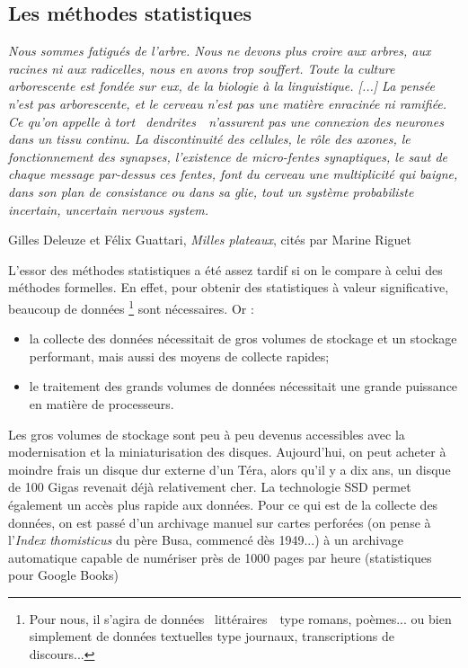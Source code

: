 \documentclass{article}
\newenvironment{citationbox}
{\begin{center}
		\begin{minipage}{.8\textwidth}
		}
		{
		\end{minipage}	
\end{center}
}
\begin{document}
			
		\subsection{Les méthodes statistiques}\label{methodes_stat}
			\begin{citationbox}
				\textit{Nous sommes fatigués de l'arbre. Nous ne devons plus croire aux arbres, aux racines ni aux radicelles, nous en avons trop souffert. Toute la culture arborescente est fondée sur eux, de la biologie à la linguistique. [...] La pensée n'est pas arborescente, et le cerveau n'est pas une matière enracinée ni ramifiée. Ce qu'on appelle à tort  \guillemotleft~dendrites~\guillemotright~n'assurent pas une connexion des neurones dans un tissu continu. La discontinuité des cellules, le rôle des axones, le fonctionnement des synapses, l'existence de micro-fentes synaptiques, le saut de chaque message par-dessus ces fentes, font du cerveau une multiplicité qui baigne, dans son plan de consistance ou dans sa glie, tout un système probabiliste incertain, uncertain nervous system.}
				\begin{flushright}
					Gilles Deleuze et Félix Guattari, \textit{Milles plateaux}, cités par Marine Riguet \autocite{riguet2017}
				\end{flushright}
			\end{citationbox}
			L'essor des méthodes statistiques a été assez tardif si on le compare à celui des méthodes formelles. En effet, pour obtenir des statistiques à valeur significative, beaucoup de données \footnote{Pour nous, il s'agira de données \guillemotleft~littéraires~\guillemotright~type romans, poèmes... ou bien simplement de données textuelles type journaux, transcriptions de discours...} sont nécessaires. Or :
			\vspace{2mm}
			\begin{itemize}
				\item la collecte des données nécessitait de gros volumes de stockage et un stockage performant, mais aussi des moyens de collecte rapides;
				\item le traitement des grands volumes de données nécessitait une grande puissance en matière de processeurs.
			\end{itemize}
			\vspace{2mm}
			Les gros volumes de stockage sont peu à peu devenus accessibles avec la modernisation et la miniaturisation des disques. Aujourd'hui, on peut acheter à moindre frais un disque dur externe d'un Téra, alors qu'il y a dix ans, un disque de 100 Gigas revenait déjà relativement cher. La technologie SSD permet également un accès plus rapide aux données. Pour ce qui est de la collecte des données, on est passé d'un archivage manuel sur cartes perforées (on pense à l'\textit{Index thomisticus} du père Busa, commencé dès 1949...) à un archivage automatique capable de numériser près de 1000 pages par heure (statistiques pour Google Books)\\
			
\end{document}
